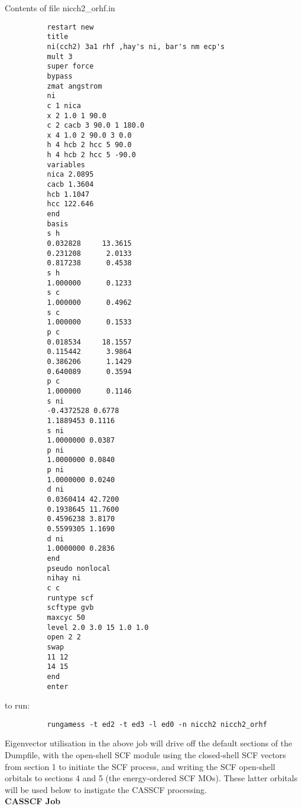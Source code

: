 \documentclass[11pt,fleqn]{article}
\begin{document}
Contents of file nicch2\_orhf.in
{
\footnotesize
\begin{verbatim}
          restart new
          title
          ni(cch2) 3a1 rhf ,hay's ni, bar's nm ecp's
          mult 3
          super force
          bypass
          zmat angstrom
          ni
          c 1 nica
          x 2 1.0 1 90.0
          c 2 cacb 3 90.0 1 180.0
          x 4 1.0 2 90.0 3 0.0
          h 4 hcb 2 hcc 5 90.0
          h 4 hcb 2 hcc 5 -90.0
          variables
          nica 2.0895
          cacb 1.3604
          hcb 1.1047
          hcc 122.646
          end
          basis
          s h
          0.032828     13.3615
          0.231208      2.0133
          0.817238      0.4538
          s h
          1.000000      0.1233
          s c
          1.000000      0.4962
          s c
          1.000000      0.1533
          p c
          0.018534     18.1557
          0.115442      3.9864
          0.386206      1.1429
          0.640089      0.3594
          p c
          1.000000      0.1146
          s ni
          -0.4372528 0.6778
          1.1889453 0.1116
          s ni
          1.0000000 0.0387
          p ni
          1.0000000 0.0840
          p ni
          1.0000000 0.0240
          d ni
          0.0360414 42.7200
          0.1938645 11.7600
          0.4596238 3.8170
          0.5599305 1.1690
          d ni
          1.0000000 0.2836
          end
          pseudo nonlocal
          nihay ni
          c c
          runtype scf
          scftype gvb
          maxcyc 50
          level 2.0 3.0 15 1.0 1.0
          open 2 2
          swap
          11 12
          14 15
          end
          enter
\end{verbatim}
}
to run:
{
\footnotesize
\begin{verbatim}
          rungamess -t ed2 -t ed3 -l ed0 -n nicch2 nicch2_orhf
\end{verbatim}
}
Eigenvector utilisation in the above job will drive off the default
sections of the Dumpfile, with the open-shell SCF module using the
closed-shell SCF vectors from section 1 to initiate the SCF process,
and writing the SCF open-shell orbitals to sections 4 and 5 (the
energy-ordered SCF MOs). These latter orbitals will be used below
to instigate the CASSCF processing.\\
 
{\bf CASSCF Job}\\
\end{document}
